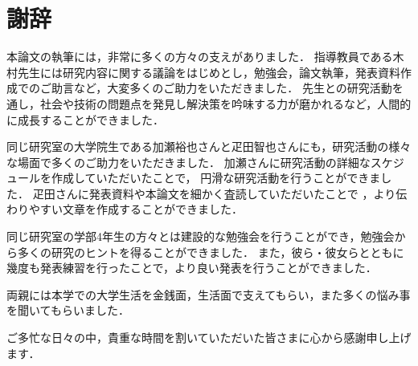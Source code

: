 \documentclass[12pt,a4j,dvipdfmx]{jreport}
\begin{document}
\chapter*{謝辞}

本論文の執筆には，非常に多くの方々の支えがありました．
指導教員である木村先生には研究内容に関する議論をはじめとし，勉強会，論文執筆，発表資料作成でのご助言など，大変多くのご助力をいただきました．
先生との研究活動を通し，社会や技術の問題点を発見し解決策を吟味する力が磨かれるなど，人間的に成長することができました．

同じ研究室の大学院生である加瀬裕也さんと疋田智也さんにも，研究活動の様々な場面で多くのご助力をいただきました．
加瀬さんに研究活動の詳細なスケジュールを作成していただいたことで，
円滑な研究活動を行うことができました．
疋田さんに発表資料や本論文を細かく査読していただいたことで
，より伝わりやすい文章を作成することができました．

同じ研究室の学部4年生の方々とは建設的な勉強会を行うことができ，勉強会から多くの研究のヒントを得ることができました．
また，彼ら・彼女らとともに幾度も発表練習を行ったことで，より良い発表を行うことができました．

両親には本学での大学生活を金銭面，生活面で支えてもらい，また多くの悩み事を聞いてもらいました．

ご多忙な日々の中，貴重な時間を割いていただいた皆さまに心から感謝申し上げます．




\end{document}
